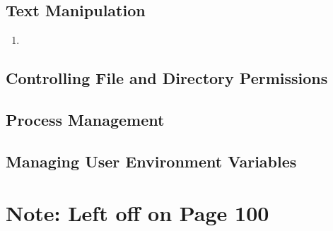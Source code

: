 \documentclass[12pt,letterpaper]{article}
\begin{document}
\subsection{Text Manipulation} 
\begin{enumerate}
    \item 
\end{enumerate}
\subsection{Controlling File and Directory Permissions}
\subsection{Process Management}
\subsection{Managing User Environment Variables}
\section{Note: Left off on Page 100}
\end{document}

